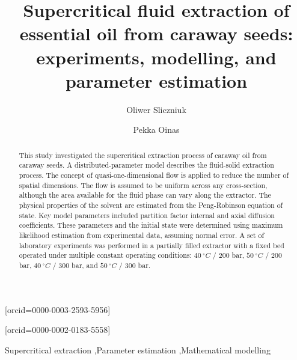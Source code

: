\documentclass[a4paper,fleqn]{cas-dc}
\begin{document}
 

\title[mode=title]{Supercritical fluid extraction of essential oil from caraway seeds: experiments, modelling, and parameter estimation}                      


\author[1]{Oliwer Sliczniuk}[orcid=0000-0003-2593-5956]
\cormark[1]

\author[1]{Pekka Oinas}[orcid=0000-0002-0183-5558]

\address[1]{Aalto University, School of Chemical Engineering, Espoo, 02150, Finland}


\begin{abstract}
This study investigated the supercritical extraction process of caraway oil from caraway seeds. A distributed-parameter model describes the fluid-solid extraction process. The concept of quasi-one-dimensional flow is applied to reduce the number of spatial dimensions. The flow is assumed to be uniform across any cross-section, although the area available for the fluid phase can vary along the extractor. The physical properties of the solvent are estimated from the Peng-Robinson equation of state. Key model parameters included partition factor internal and axial diffusion coefficients. These parameters and the initial state were determined using maximum likelihood estimation from experimental data, assuming normal error. A set of laboratory experiments was performed in a partially filled extractor with a fixed bed operated under multiple constant operating conditions: $40~^\circ C$ / $200$ bar, $50~^\circ C$ / $200$ bar, $40~^\circ C$ / $300$ bar, and $50~^\circ C$ / $300$ bar. 

\end{abstract}

\begin{keywords}
Supercritical extraction \sep Parameter estimation \sep Mathematical modelling
\end{keywords}
\end{document}
